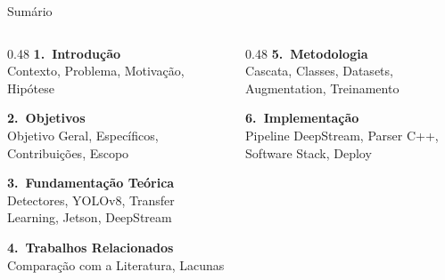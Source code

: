 
{
\begin{frame}[plain]
  \titlepage
\end{frame}
}

{%
\renewcommand{\InfSectionNumber}{0}%
\begin{frame}{Sum\'{a}rio}
  \vfill
  \begin{columns}[T]
    \begin{column}{0.48\textwidth}
      {\small\color{inputcolor}\textbf{1.\ Introdu\c{c}\~{a}o}}\\[2pt]
      {\scriptsize\color{sublabelcolor}
        \quad Contexto, Problema, Motiva\c{c}\~{a}o, Hip\'{o}tese}

      \vspace{3mm}

      {\small\color{backbonecolor}\textbf{2.\ Objetivos}}\\[2pt]
      {\scriptsize\color{sublabelcolor}
        \quad Objetivo Geral, Espec\'{i}ficos, Contribui\c{c}\~{o}es, Escopo}

      \vspace{3mm}

      {\small\color{neckcolor}\textbf{3.\ Fundamenta\c{c}\~{a}o Te\'{o}rica}}\\[2pt]
      {\scriptsize\color{sublabelcolor}
        \quad Detectores, YOLOv8, Transfer Learning, Jetson, DeepStream}

      \vspace{3mm}

      {\small\color{detectioncolor}\textbf{4.\ Trabalhos Relacionados}}\\[2pt]
      {\scriptsize\color{sublabelcolor}
        \quad Compara\c{c}\~{a}o com a Literatura, Lacunas}
    \end{column}
    \begin{column}{0.48\textwidth}
      {\small\color{headcolor}\textbf{5.\ Metodologia}}\\[2pt]
      {\scriptsize\color{sublabelcolor}
        \quad Cascata, Classes, Datasets, Augmentation, Treinamento}

      \vspace{3mm}

      {\small\color{outputcolor}\textbf{6.\ Implementa\c{c}\~{a}o}}\\[2pt]
      {\scriptsize\color{sublabelcolor}
        \quad Pipeline DeepStream, Parser C++, Software Stack, Deploy}


\end{column}
\end{columns}
\end{frame}}
